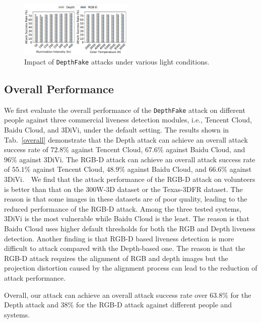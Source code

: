 \begin{figure}[pt]
	\centerline{\includegraphics[width = 0.48\textwidth]{figures/light_condition.pdf}}
	\vspace{-0.15in}
	\caption{Impact of \texttt{DepthFake} attacks under various light conditions.}
	\label{light_condition}
	\vspace{-0.1in}
\end{figure}

\subsection{Overall Performance}
We first evaluate the overall performance of the \texttt{DepthFake}  attack on different people against three commercial liveness detection modules, i.e., Tencent Cloud, Baidu Cloud, and 3DiVi, under the default setting. 
The results shown in Tab.~\ref{overall} demonstrate that the Depth attack can achieve an overall attack success rate of $72.8\%$ against Tencent Cloud, $67.6\%$ against Baidu Cloud, and $96\%$ against 3DiVi. The RGB-D attack can achieve an overall attack success rate of $55.1\%$ against Tencent Cloud, $48.9\%$ against Baidu Cloud, and $66.6\%$ against 3DiVi.  We find that the attack performance of the RGB-D attack on volunteers is better than that on the 300W-3D dataset or the Texas-3DFR dataset. The reason is that some images in these  datasets are of poor quality, leading to the reduced performance of the RGB-D attack. 
Among the three tested systems, 3DiVi is the most vulnerable while Baidu Cloud is the least. The reason is that Baidu Cloud uses higher default thresholds for both the RGB and Depth liveness detection. 
Another finding is that RGB-D based liveness detection is more difficult to attack compared with the Depth-based one. The reason is that the RGB-D attack requires the alignment of RGB and depth images but the projection distortion caused by the alignment process can lead to the reduction of attack performance.

Overall, our attack can achieve an overall attack success rate  over $63.8\%$ for the Depth attack and $38\%$ for the RGB-D attack against different people and systems.

